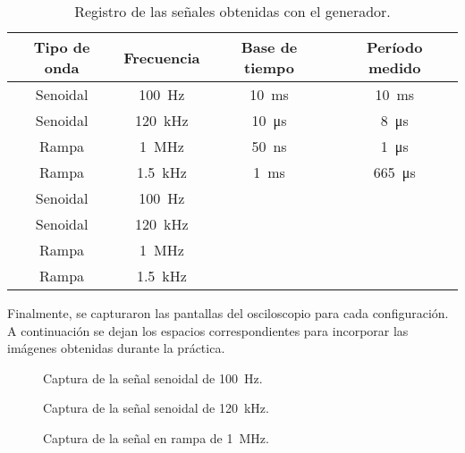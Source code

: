 \documentclass[conference]{IEEEtran} %
\begin{document}
\begin{table}[H]
    \centering
    \caption{Registro de las señales obtenidas con el generador.}
    \label{tab:frecuencia}
    \begin{tabular}{|c|c|c|c|}
        \hline
        Tipo de onda & Frecuencia & Base de tiempo & Período medido \\ \hline

        Senoidal & \SI{100}{\hertz} & \SI{10}{\milli\second} & \SI{10}{\milli\second} \\ \hline
        Senoidal & \SI{120}{\kilo\hertz} & \SI{10}{\micro\second} & \SI{8}{\micro\second} \\ \hline
        Rampa & \SI{1}{\mega\hertz} & \SI{50}{\nano\second} & \SI{1}{\micro\second} \\ \hline
        Rampa & \SI{1.5}{\kilo\hertz} & \SI{1}{\milli\second} & \SI{665}{\micro\second} \\ \hline

        Senoidal & \SI{100}{\hertz} & \textemdash{} & \textemdash{} \\ \hline
        Senoidal & \SI{120}{\kilo\hertz} & \textemdash{} & \textemdash{} \\ \hline
        Rampa & \SI{1}{\mega\hertz} & \textemdash{} & \textemdash{} \\ \hline
        Rampa & \SI{1.5}{\kilo\hertz} & \textemdash{} & \textemdash{} \\ \hline

    \end{tabular}
\end{table}

Finalmente, se capturaron las pantallas del osciloscopio para cada configuración. A continuación se dejan los espacios correspondientes para incorporar las imágenes obtenidas durante la práctica.

\begin{figure}[H]
    \centering
    \framebox[0.75\linewidth]{\rule{0pt}{3.5cm}}
    \caption{Captura de la señal senoidal de \SI{100}{\hertz}.}
    \label{fig:frecuencia-senoidal-100hz}
\end{figure}

\begin{figure}[H]
    \centering
    \framebox[0.75\linewidth]{\rule{0pt}{3.5cm}}
    \caption{Captura de la señal senoidal de \SI{120}{\kilo\hertz}.}
    \label{fig:frecuencia-senoidal-120khz}
\end{figure}

\begin{figure}[H]
    \centering
    \framebox[0.75\linewidth]{\rule{0pt}{3.5cm}}
    \caption{Captura de la señal en rampa de \SI{1}{\mega\hertz}.}
    \label{fig:frecuencia-rampa-1mhz}
\end{figure}
\end{document}

